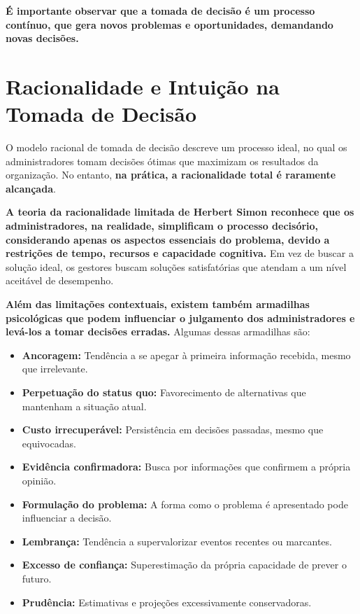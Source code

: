 \textbf{É importante observar que a tomada de decisão é um processo contínuo, que gera novos problemas e oportunidades, demandando novas decisões.}

\section{Racionalidade e Intuição na Tomada de Decisão}

O modelo racional de tomada de decisão descreve um processo ideal, no qual os administradores tomam decisões ótimas que maximizam os resultados da organização. No entanto, \textbf{na prática, a racionalidade total é raramente alcançada}.

\textbf{A teoria da racionalidade limitada de Herbert Simon reconhece que os administradores, na realidade, simplificam o processo decisório, considerando apenas os aspectos essenciais do problema, devido a restrições de tempo, recursos e capacidade cognitiva.} Em vez de buscar a solução ideal, os gestores buscam soluções satisfatórias que atendam a um nível aceitável de desempenho.

\textbf{Além das limitações contextuais, existem também armadilhas psicológicas que podem influenciar o julgamento dos administradores e levá-los a tomar decisões erradas.} Algumas dessas armadilhas são:
\begin{itemize}
    \item \textbf{Ancoragem:} Tendência a se apegar à primeira informação recebida, mesmo que irrelevante.
    \item \textbf{Perpetuação do status quo:} Favorecimento de alternativas que mantenham a situação atual.
    \item \textbf{Custo irrecuperável:} Persistência em decisões passadas, mesmo que equivocadas.
    \item \textbf{Evidência confirmadora:} Busca por informações que confirmem a própria opinião.
    \item \textbf{Formulação do problema:} A forma como o problema é apresentado pode influenciar a decisão.
    \item \textbf{Lembrança:} Tendência a supervalorizar eventos recentes ou marcantes.
    \item \textbf{Excesso de confiança:} Superestimação da própria capacidade de prever o futuro.
    \item \textbf{Prudência:} Estimativas e projeções excessivamente conservadoras.
\end{itemize}

